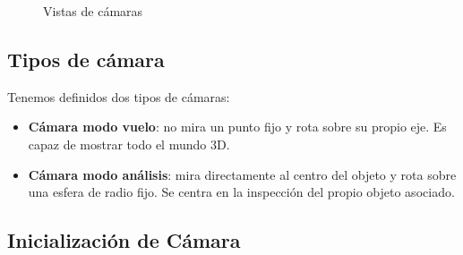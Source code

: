 \documentclass[12pt,a4paper]{article}
\begin{document}
\begin{figure}[H]
\hfill
{}\hfill
{}
\caption{Vistas de cámaras}
\end{figure}

\subsection{Tipos de cámara}

Tenemos definidos dos tipos de cámaras:

\begin{itemize}
\item \textbf{Cámara modo vuelo}: no mira un punto fijo y rota sobre su propio eje. Es capaz de mostrar todo el mundo 3D.
\item \textbf{Cámara modo análisis}: mira directamente al centro del objeto y rota sobre una esfera de radio fijo. Se centra en la inspección del propio objeto asociado.
\end{itemize}


\subsection{Inicialización de Cámara}
\end{document}
